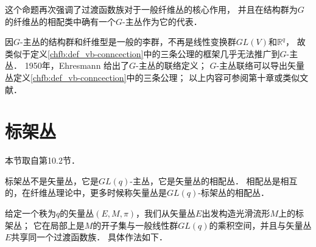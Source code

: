 这个命题再次强调了过渡函数族对于一般纤维丛的核心作用，
并且在结构群为$G$的纤维丛的相配类中确有一个$G$-主丛作为它的代表．


因$G$-主丛的结构群和纤维型是一般的李群，不再是线性变换群$GL(V)$和$\mathbb{R}^q$，
故类似于定义\ref{chfb:def_vb-conncection}中的三条公理的框架几乎无法推广到$G$-主丛．
1950年，Ehresmann 给出了$G$-主丛的联络定义；
$G$-主丛联络可以导出矢量丛定义\ref{chfb:def_vb-conncection}中的三条公理；
以上内容可参阅\parencite{chen-li-2004v2}第十章或类似文献．






\section{标架丛}\label{chfb:sec_frame-bundles}

本节取自\parencite{chen-li-2004v2}第10.2节．

标架丛不是矢量丛，它是$GL(q)$-主丛，它是矢量丛的相配丛．
相配丛是相互的，在纤维丛理论中，更多时候称矢量丛是$GL(q)$-标架丛的相配丛．



给定一个秩为$q$的矢量丛$(E,M,\pi)$，我们从矢量丛$E$出发构造光滑流形$M$上的标架丛；
它在局部上是$M$的开子集与一般线性群$GL(q)$的乘积空间，并且与矢量丛$E$共享同一个过渡函数族．
具体作法如下．

